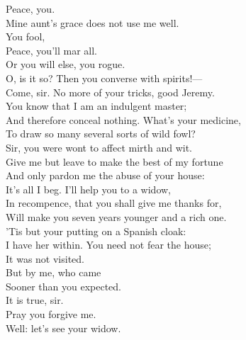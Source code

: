 \documentclass[a4paper,oneside,12pt]{memoir}
\begin{document}
\begin{drama*}
\lovewitspeaks {} Peace, you.\\
\dapperspeaks {} Mine aunt's grace does not use me well.\\
\subtlespeaks {}  You fool,\\
Peace, you'll mar all.\\
\facespeaks {}
 Or you will else, you rogue.\\
\lovewitspeaks O, is it so? Then you converse with spirits!---\\
Come, sir. No more of your tricks, good Jeremy.\\
You know that I am an indulgent master;\\
And therefore conceal nothing. What's your medicine,\\
To draw so many several sorts of wild fowl?\\
\facespeaks Sir, you were wont to affect mirth and wit.\\
Give me but leave to make the best of my fortune\\
And only pardon me the abuse of your house:\\
It's all I beg. I'll help you to a widow,\\
In recompence, that you shall give me thanks for,\\
Will make you seven years younger and a rich one.\\
'Tis but your putting on a Spanish cloak:\\
I have her within. You need not fear the house;\\
It was not visited.\\
\lovewitspeaks {} But by me, who came\\
Sooner than you expected.\\
\facespeaks {} It is true, sir.\\
Pray you forgive me.\\
\lovewitspeaks {} Well: let's see your widow.\\
\scene


\end{drama*}
\end{document}
